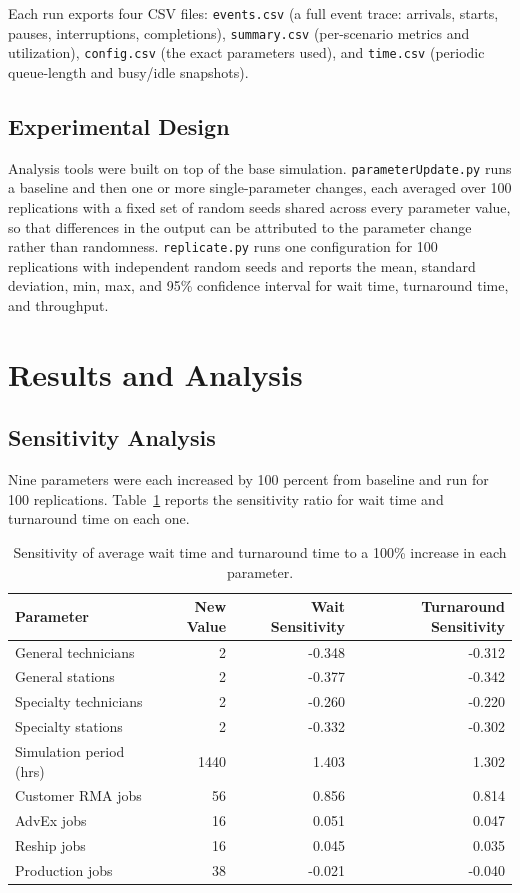 \documentclass[12pt, letterpaper, twoside]{article}
\begin{document}
Each run exports four CSV files: \texttt{events.csv} (a full event trace: arrivals,
starts, pauses, interruptions, completions), \texttt{summary.csv} (per-scenario
metrics and utilization), \texttt{config.csv} (the exact parameters used), and
\texttt{time.csv} (periodic queue-length and busy/idle snapshots).

\subsection{Experimental Design}

Analysis tools were built on top of the base simulation. \texttt{parameterUpdate.py}
runs a baseline and then one or more single-parameter changes, each averaged over 100
replications with a fixed set of random seeds shared across every parameter value, 
so that differences in the output can be attributed to the
parameter change rather than randomness. \texttt{replicate.py} runs one configuration
for 100 replications with independent random seeds and reports the mean, standard
deviation, min, max, and 95\% confidence interval for wait time, turnaround time, and
throughput.

\section{Results and Analysis}
\label{sec:results}

\subsection{Sensitivity Analysis}

Nine parameters were each increased by 100 percent from baseline and run for 100
replications. Table~\ref{tab:sensitivity} reports the sensitivity ratio
for wait time and turnaround time on each one.

\begin{table}[H]
\centering
\caption{Sensitivity of average wait time and turnaround time to a 100\% increase in each parameter.}
\label{tab:sensitivity}
\small
\begin{tabular}{lrrr}
\toprule
\textbf{Parameter} & \textbf{New Value} & \textbf{Wait Sensitivity} & \textbf{Turnaround Sensitivity} \\
\midrule
General technicians & 2 & -0.348 & -0.312 \\
General stations & 2 & -0.377 & -0.342 \\
Specialty technicians & 2 & -0.260 & -0.220 \\
Specialty stations & 2 & -0.332 & -0.302 \\
Simulation period (hrs) & 1440 & 1.403 & 1.302 \\
Customer RMA jobs & 56 & 0.856 & 0.814 \\
AdvEx jobs & 16 & 0.051 & 0.047 \\
Reship jobs & 16 & 0.045 & 0.035 \\
Production jobs & 38 & -0.021 & -0.040 \\
\bottomrule
\end{tabular}
\end{table}
\end{document}

